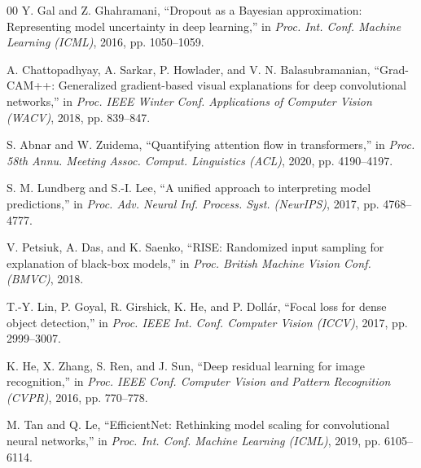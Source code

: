 \documentclass[conference]{IEEEtran}
\begin{document}
\begin{thebibliography}{00}
 Y. Gal and Z. Ghahramani, ``Dropout as a Bayesian approximation:
Representing model uncertainty in deep learning,'' in \emph{Proc. Int. Conf. Machine
Learning (ICML)}, 2016, pp. 1050--1059.

 A. Chattopadhyay, A. Sarkar, P. Howlader, and V. N.
Balasubramanian, ``Grad-CAM++: Generalized gradient-based visual explanations for deep
convolutional networks,'' in \emph{Proc. IEEE Winter Conf. Applications of Computer Vision
(WACV)}, 2018, pp. 839--847.

 S. Abnar and W. Zuidema, ``Quantifying attention flow in
transformers,'' in \emph{Proc. 58th Annu. Meeting Assoc. Comput. Linguistics (ACL)}, 2020,
pp. 4190--4197.

 S. M. Lundberg and S.-I. Lee, ``A unified approach to interpreting
model predictions,'' in \emph{Proc. Adv. Neural Inf. Process. Syst. (NeurIPS)}, 2017, pp.
4768--4777.

 V. Petsiuk, A. Das, and K. Saenko, ``RISE: Randomized input sampling
for explanation of black-box models,'' in \emph{Proc. British Machine Vision Conf. (BMVC)},
2018.

 T.-Y. Lin, P. Goyal, R. Girshick, K. He, and P. Doll\'ar, ``Focal loss for
dense object detection,'' in \emph{Proc. IEEE Int. Conf. Computer Vision (ICCV)}, 2017, pp.
2999--3007.

 K. He, X. Zhang, S. Ren, and J. Sun, ``Deep residual learning for image
recognition,'' in \emph{Proc. IEEE Conf. Computer Vision and Pattern Recognition (CVPR)},
2016, pp. 770--778.

 M. Tan and Q. Le, ``EfficientNet: Rethinking model scaling for
convolutional neural networks,'' in \emph{Proc. Int. Conf. Machine Learning (ICML)}, 2019,
pp. 6105--6114.

\end{thebibliography}
\end{document}
